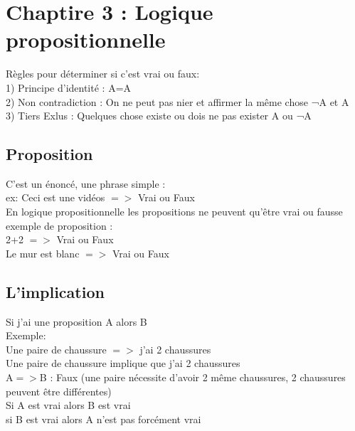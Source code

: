 \newpage

\chapter{Chaptire 3 : Logique propositionnelle}
\vspace{5mm} %

Règles pour déterminer si c'est vrai ou faux: \\

1) Principe d'identité : A=A \\

2) Non contradiction : On ne peut pas nier et affirmer la même chose ¬A et A \\

3) Tiers Exlus : Quelques chose existe ou dois ne pas exister A ou ¬A \\


\section{Proposition}
\vspace{5mm} %

C'est un énoncé, une phrase simple : \\
ex: Ceci est une vidéos $=>$ Vrai ou Faux \\

En logique propositionnelle les propositions ne peuvent qu'être vrai ou fausse \\

exemple de proposition : \\
2+2 $=>$ Vrai ou Faux \\
Le mur est blanc $=>$ Vrai ou Faux \\

\section{L'implication}
\vspace{5mm} %

Si j'ai une proposition A alors B \\

Exemple: \\
Une paire de chaussure $=>$ j'ai 2 chaussures \\
Une paire de chaussure implique que j'ai 2 chaussures \\
A$=>$B : Faux (une paire nécessite d'avoir 2 même chaussures, 2 chaussures peuvent être différentes)\\
Si A est vrai alors B est vrai \\
si B est vrai alors A n'est pas forcément vrai \\

